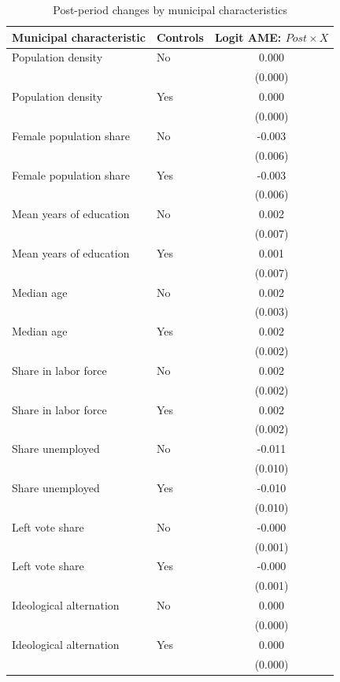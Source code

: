 \begin{table}[!htbp]
\centering
\renewcommand{\arraystretch}{1.25}
\setlength{\tabcolsep}{6pt}
\caption{Post-period changes by municipal characteristics}
\label{tab:logit_post_x_mfx_stata}
\small
\begin{tabular}{llc}
\hline
Municipal characteristic & Controls & Logit AME: \(Post \times X\) \\
\hline
Population density & No & 0.000 \\
 & & (0.000) \\
Population density & Yes & 0.000 \\
 & & (0.000) \\
\addlinespace
Female population share & No & -0.003 \\
 & & (0.006) \\
Female population share & Yes & -0.003 \\
 & & (0.006) \\
\addlinespace
Mean years of education & No & 0.002 \\
 & & (0.007) \\
Mean years of education & Yes & 0.001 \\
 & & (0.007) \\
\addlinespace
Median age & No & 0.002 \\
 & & (0.003) \\
Median age & Yes & 0.002 \\
 & & (0.002) \\
\addlinespace
Share in labor force & No & 0.002 \\
 & & (0.002) \\
Share in labor force & Yes & 0.002 \\
 & & (0.002) \\
\addlinespace
Share unemployed & No & -0.011 \\
 & & (0.010) \\
Share unemployed & Yes & -0.010 \\
 & & (0.010) \\
\addlinespace
Left vote share & No & -0.000 \\
 & & (0.001) \\
Left vote share & Yes & -0.000 \\
 & & (0.001) \\
\addlinespace
Ideological alternation & No & 0.000 \\
 & & (0.000) \\
Ideological alternation & Yes & 0.000 \\
 & & (0.000) \\

\end{tabular}
\end{table}
